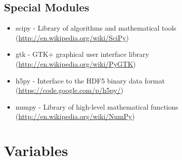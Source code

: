 \documentclass[a4paper,10pt]{scrartcl}
\begin{document}
\subsection{Special Modules}
\begin{itemize}
\item scipy - Library of algorithms and mathematical tools (\url{http://en.wikipedia.org/wiki/SciPy})
\item gtk - GTK+ graphical user interface library (\url{http://en.wikipedia.org/wiki/PyGTK})
\item h5py - Interface to the HDF5 binary data format (\url{https://code.google.com/p/h5py/})
\item numpy - Library of high-level mathematical functions (\url{http://en.wikipedia.org/wiki/NumPy})
\end{itemize}

\section{Variables}
\end{document}
